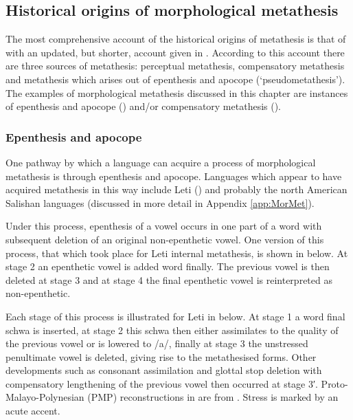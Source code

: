 \subsection{Historical origins of morphological metathesis}\label{sec:OriMorMet}
The most comprehensive account of the historical origins of metathesis
is that of \cite{blga98} with an updated, but shorter, account given in \cite{blga04}.
According to this account there are three sources of metathesis:
perceptual metathesis, compensatory metathesis and metathesis which arises
out of epenthesis and apocope (`pseudometathesis').
The examples of morphological metathesis discussed
in this chapter are instances of epenthesis and apocope ()
and/or compensatory metathesis ().

\subsubsection{Epenthesis and apocope}\label{sec:EpeApo}
One pathway by which a language can acquire a process
of morphological metathesis is through epenthesis and apocope.
Languages which appear to have acquired metathesis in this way include Leti ()
and probably the north American Salishan languages
(discussed in more detail in Appendix \ref{app:MorMet}).

Under this process, epenthesis of a vowel occurs in one part of a word
with subsequent deletion of an original non-epenthetic vowel.
One version of this process, that which took place for Leti internal metathesis,
is shown in  below.
At stage 2 an epenthetic vowel is added word finally.
The previous vowel is then deleted at stage 3 and at stage 4
the final epenthetic vowel is reinterpreted as non-epenthetic.

\begin{exe}\let\eachwordone=\textnormal
	\label{ex:EpeApo}
\end{exe}

Each stage of this process is illustrated
for Leti in  below.
At stage 1 a word final schwa is inserted,
at stage 2 this schwa then either assimilates
to the quality of the previous vowel or is lowered to /a/,
finally at stage 3 the unstressed penultimate vowel is deleted,
giving rise to the metathesised forms.
Other developments such as consonant assimilation and glottal stop
deletion with compensatory lengthening of the previous vowel
then occurred at stage 3′.
Proto-Malayo-Polynesian (PMP) reconstructions in  are from \cite{bltr}.
Stress is marked by an acute accent.

